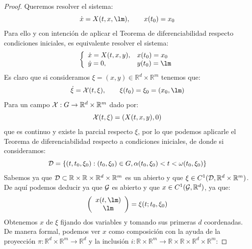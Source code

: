 \begin{proof}
    Queremos resolver el sistema:
    \begin{equation*}
        \dot{x} = X(t,x,\lm), \qquad x(t_0) = x_0
    \end{equation*}
    Para ello y con intención de aplicar el Teorema de diferenciabilidad respecto condiciones iniciales, es equivalente resolver el sistema:
    \begin{equation*}
        \left\{\begin{array}{ll}
                \dot{x} = X(t,x,y), & x(t_0) = x_0 \\
                \dot{y} = 0, & y(t_0) = \lm
        \end{array}\right.
    \end{equation*}
    Es claro que si consideramos $\xi = (x,y)\in \mathbb{R}^d\times\mathbb{R}^m$ tenemos que:
    \begin{equation*}
        \dot{\xi} = \cc{X}(t,\xi), \qquad \xi(t_0) = \xi_0 = (x_0,\lm)
    \end{equation*}
    Para un campo $\mathcal{X}:G\to\mathbb{R}^d\times\mathbb{R}^m$ dado por:
    \begin{equation*}
        \mathcal{X}(t,\xi) = (X(t,x,y), 0)
    \end{equation*}
    que es continuo y existe la parcial respecto $\xi$, por lo que podemos aplicarle el Teorema de diferenciabilidad respecto a condiciones iniciales, de donde si consideramos:
    \begin{equation*}
        \mathcal{D} = \{(t,t_0,\xi_0) : (t_0,\xi_0)\in G, \alpha(t_0,\xi_0)<t<\omega(t_0,\xi_0)\}
    \end{equation*}
    Sabemos ya que $\mathcal{D}\subset \mathbb{R}\times\mathbb{R}\times\mathbb{R}^d\times\mathbb{R}^m$ es un abierto y que $\xi \in C^1(\mathcal{D},\mathbb{R}^d\times\mathbb{R}^m)$. De aquí podemos deducir ya que $\mathcal{G}$ es abierto y que $x\in C^1(\mathcal{G},\mathbb{R}^d)$, ya que: 
    \begin{equation*}
        \left(\begin{array}{cc}
            x(t,\lm) \\
            \lm 
        \end{array}\right) = \xi(t;t_0,\xi_0) 
    \end{equation*}
    Obtenemos $x$ de $\xi$ fijando dos variables y tomando sus primeras $d$ coordenadas. De manera formal, podemos ver $x$ como composición con la ayuda de la proyección $\pi:\mathbb{R}^d\times\mathbb{R}^m\to\mathbb{R}^d$ y la inclusión $i:\mathbb{R}\times\mathbb{R}^m\to\mathbb{R}\times\mathbb{R}\times\mathbb{R}^d\times\mathbb{R}^m$:

\end{proof}
